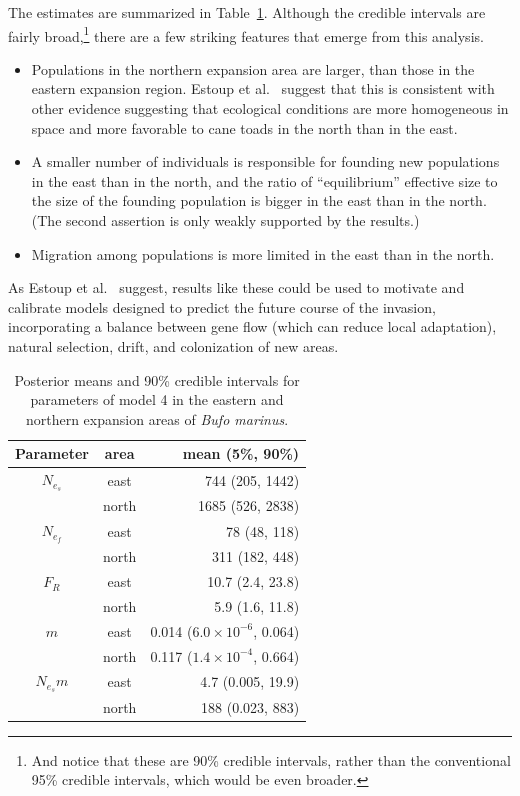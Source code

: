 \documentclass[12pt]{article}
\begin{document}
The estimates are summarized in Table~\ref{table:cane-toad}. Although
the credible intervals are fairly broad,\footnote{And notice that
  these are 90\% credible intervals, rather than the conventional 95\%
  credible intervals, which would be even broader.} there are a few
striking features that emerge from this analysis.

\begin{itemize}

\item Populations in the northern expansion area are larger, than
  those in the eastern expansion region. Estoup et
  al.~\cite{Estoup-etal-2004} suggest that this is consistent with
  other evidence suggesting that ecological conditions are more
  homogeneous in space and more favorable to cane toads in the north
  than in the east.

\item A smaller number of individuals is responsible for founding new
  populations in the east than in the north, and the ratio of
  ``equilibrium'' effective size to the size of the founding
  population is bigger in the east than in the north. (The second
  assertion is only weakly supported by the results.)

\item Migration among populations is more limited in the east than in
  the north. 

\end{itemize}

As Estoup et al.~\cite{Estoup-etal-2004} suggest, results like these
could be used to motivate and calibrate models designed to predict the
future course of the invasion, incorporating a balance between gene
flow (which can reduce local adaptation), natural selection, drift,
and colonization of new areas.

\begin{table}
\begin{center}
\begin{tabular}{ccr}
\hline\hline
Parameter & area & mean (5\%, 90\%) \\
\hline
$N_{e_s}$ & east & 744 (205, 1442) \\
         & north & 1685 (526, 2838) \\
$N_{e_f}$ & east & 78 (48, 118) \\
         & north & 311 (182, 448) \\
$F_R$    & east & 10.7 (2.4, 23.8) \\
         & north & 5.9 (1.6, 11.8) \\
$m$      & east & 0.014 ($6.0 \times 10^{-6}$, 0.064) \\
         & north & 0.117 ($1.4 \times 10^{-4}$, 0.664) \\
$N_{e_s}m$ & east & 4.7 (0.005, 19.9) \\
          & north & 188 (0.023, 883) \\
\hline
\end{tabular}
\end{center}
\caption{Posterior means and 90\% credible intervals for parameters of
  model 4 in the eastern and northern expansion areas of {\it Bufo
    marinus}.}\label{table:cane-toad}
\end{table}
\end{document}
